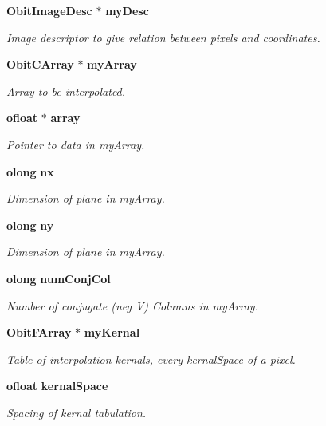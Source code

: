 \begin{CompactItemize}
{\bf Obit\-Image\-Desc} $\ast$ {\bf my\-Desc}
\begin{CompactList}\small\item\em Image descriptor to give relation between pixels and coordinates. \item\end{CompactList}\item 
{\bf Obit\-CArray} $\ast$ {\bf my\-Array}
\begin{CompactList}\small\item\em Array to be interpolated. \item\end{CompactList}\item 
{\bf ofloat} $\ast$ {\bf array}
\begin{CompactList}\small\item\em Pointer to data in my\-Array. \item\end{CompactList}\item 
{\bf olong} {\bf nx}
\begin{CompactList}\small\item\em Dimension of plane in my\-Array. \item\end{CompactList}\item 
{\bf olong} {\bf ny}
\begin{CompactList}\small\item\em Dimension of plane in my\-Array. \item\end{CompactList}\item 
{\bf olong} {\bf num\-Conj\-Col}
\begin{CompactList}\small\item\em Number of conjugate (neg V) Columns in my\-Array. \item\end{CompactList}\item 
{\bf Obit\-FArray} $\ast$ {\bf my\-Kernal}
\begin{CompactList}\small\item\em Table of interpolation kernals, every kernal\-Space of a pixel. \item\end{CompactList}\item 
{\bf ofloat} {\bf kernal\-Space}
\begin{CompactList}\small\item\em Spacing of kernal tabulation. \item\end{CompactList}\item 

\end{CompactItemize}
